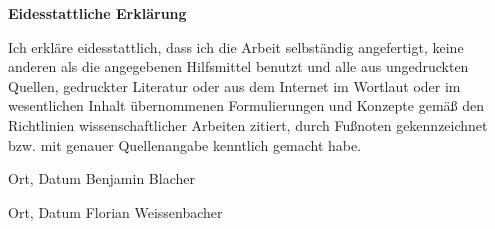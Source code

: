 \textbf{\Large Eidesstattliche Erklärung}

Ich erkläre eidesstattlich, dass ich die Arbeit selbständig angefertigt, keine anderen als die angegebenen Hilfsmittel benutzt und alle aus ungedruckten Quellen, gedruckter Literatur oder aus dem Internet im Wortlaut oder im wesentlichen Inhalt übernommenen Formulierungen und Konzepte gemäß den Richtlinien wissenschaftlicher Arbeiten zitiert, durch Fußnoten gekennzeichnet bzw. mit genauer Quellenangabe kenntlich gemacht habe.

\vspace{2cm}
\hspace{2cm}\hrulefill{}\hspace{2.35cm}\hrulefill{}\hspace{1cm}

\hspace{2cm} Ort, Datum \hspace{5cm} Benjamin Blacher \hfill

\vspace{2cm}
\hspace{2cm}\hrulefill{}\hspace{2.35cm}\hrulefill{}\hspace{1cm}

\hspace{2cm} Ort, Datum \hspace{5cm} Florian Weissenbacher \hfill